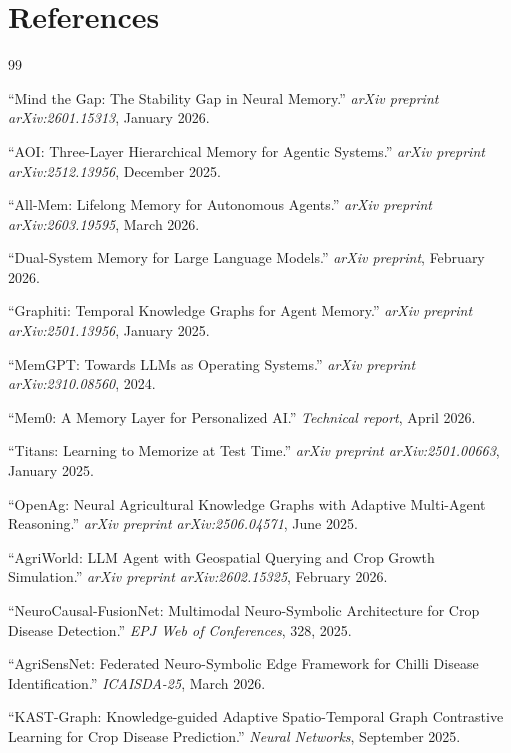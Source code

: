 \documentclass{article}
\begin{document}
\section*{References}
{\small
\begin{thebibliography}{99}

  ``Mind the Gap: The Stability Gap in Neural Memory.''
  \textit{arXiv preprint arXiv:2601.15313}, January 2026.

  ``AOI: Three-Layer Hierarchical Memory for Agentic Systems.''
  \textit{arXiv preprint arXiv:2512.13956}, December 2025.

  ``All-Mem: Lifelong Memory for Autonomous Agents.''
  \textit{arXiv preprint arXiv:2603.19595}, March 2026.

  ``Dual-System Memory for Large Language Models.''
  \textit{arXiv preprint}, February 2026.

  ``Graphiti: Temporal Knowledge Graphs for Agent Memory.''
  \textit{arXiv preprint arXiv:2501.13956}, January 2025.

  ``MemGPT: Towards LLMs as Operating Systems.''
  \textit{arXiv preprint arXiv:2310.08560}, 2024.

  ``Mem0: A Memory Layer for Personalized AI.''
  \textit{Technical report}, April 2026.

  ``Titans: Learning to Memorize at Test Time.''
  \textit{arXiv preprint arXiv:2501.00663}, January 2025.

  ``OpenAg: Neural Agricultural Knowledge Graphs with Adaptive Multi-Agent
  Reasoning.''
  \textit{arXiv preprint arXiv:2506.04571}, June 2025.

  ``AgriWorld: LLM Agent with Geospatial Querying and Crop Growth
  Simulation.''
  \textit{arXiv preprint arXiv:2602.15325}, February 2026.

  ``NeuroCausal-FusionNet: Multimodal Neuro-Symbolic Architecture for
  Crop Disease Detection.''
  \textit{EPJ Web of Conferences}, 328, 2025.

  ``AgriSensNet: Federated Neuro-Symbolic Edge Framework for Chilli
  Disease Identification.''
  \textit{ICAISDA-25}, March 2026.

  ``KAST-Graph: Knowledge-guided Adaptive Spatio-Temporal Graph
  Contrastive Learning for Crop Disease Prediction.''
  \textit{Neural Networks}, September 2025.


\end{thebibliography}}
\end{document}
